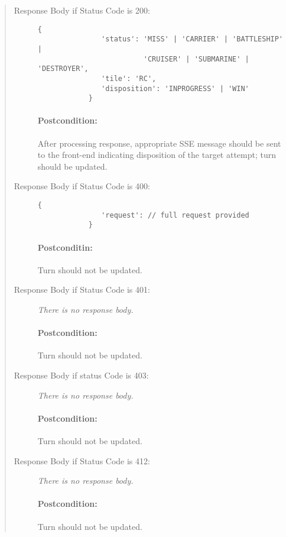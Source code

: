 \documentclass[10pt]{article}
\begin{document}
\begin{quote}
\begin{description}
      \item[Response Body if Status Code is 200:]
         \begin{lstlisting}[gobble=12]
            {
               'status': 'MISS' | 'CARRIER' | 'BATTLESHIP' | 
                         'CRUISER' | 'SUBMARINE' | 'DESTROYER',
               'tile': 'RC',
               'disposition': 'INPROGRESS' | 'WIN'
            }
         \end{lstlisting}

         \paragraph{Postcondition:} After processing response, appropriate SSE message should be sent to the front-end indicating disposition of the target attempt; turn should be updated.

      \item[Response Body if Status Code is 400:]
         \begin{lstlisting}[gobble=12]
            {
               'request': // full request provided
            }
         \end{lstlisting}

         \paragraph{Postconditin:} Turn should not be updated.

      \item[Response Body if Status Code is 401:] \emph{There is no response body.}
      
         \paragraph{Postcondition:} Turn should not be updated.

      \item[Response Body if status Code is 403:] \emph{There is no response body.}
      
         \paragraph{Postcondition:} Turn should not be updated.
      
      \item[Response Body if Status Code is 412:] \emph{There is no response body.} 
    
         \paragraph{Postcondition:} Turn should not be updated.
   \end{description}
\end{quote}
\end{document}
